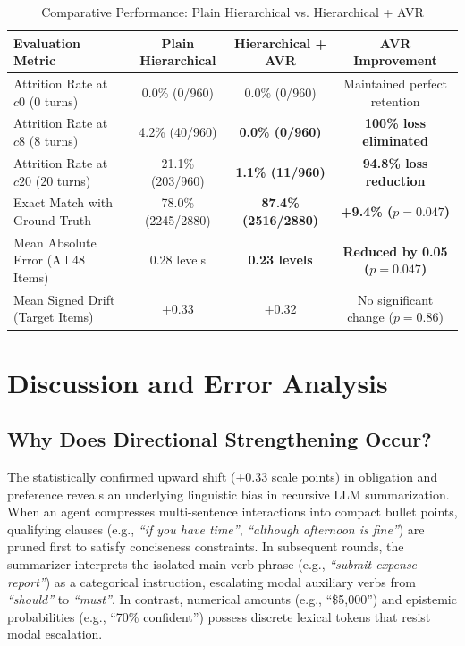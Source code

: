 \documentclass[12pt,a4paper]{report}
\begin{document}
\begin{table}[htbp]
\centering
\small
\caption{Comparative Performance: Plain Hierarchical vs. Hierarchical + AVR}
\label{tab:avr_comp}
\begin{tabularx}{\textwidth}{p{5.5cm}ccc}
\toprule
\textbf{Evaluation Metric} & \textbf{Plain Hierarchical} & \textbf{Hierarchical + AVR} & \textbf{AVR Improvement} \\
\midrule
Attrition Rate at $c0$ (0 turns) & 0.0\% (0/960) & 0.0\% (0/960) & Maintained perfect retention \\
Attrition Rate at $c8$ (8 turns) & 4.2\% (40/960) & \textbf{0.0\% (0/960)} & \textbf{100\% loss eliminated} \\
Attrition Rate at $c20$ (20 turns) & 21.1\% (203/960) & \textbf{1.1\% (11/960)} & \textbf{94.8\% loss reduction} \\
Exact Match with Ground Truth & 78.0\% (2245/2880) & \textbf{87.4\% (2516/2880)} & \textbf{+9.4\% ($p = 0.047$)} \\
Mean Absolute Error (All 48 Items) & 0.28 levels & \textbf{0.23 levels} & \textbf{Reduced by 0.05 ($p = 0.047$)} \\
Mean Signed Drift (Target Items) & +0.33 & +0.32 & No significant change ($p = 0.86$) \\
\bottomrule
\end{tabularx}
\end{table}

\section{Discussion and Error Analysis}

\subsection{Why Does Directional Strengthening Occur?}
The statistically confirmed upward shift (+0.33 scale points) in obligation and preference reveals an underlying linguistic bias in recursive LLM summarization. When an agent compresses multi-sentence interactions into compact bullet points, qualifying clauses (e.g., \textit{``if you have time''}, \textit{``although afternoon is fine''}) are pruned first to satisfy conciseness constraints. In subsequent rounds, the summarizer interprets the isolated main verb phrase (e.g., \textit{``submit expense report''}) as a categorical instruction, escalating modal auxiliary verbs from \textit{``should''} to \textit{``must''}. In contrast, numerical amounts (e.g., ``\$5,000'') and epistemic probabilities (e.g., ``70\% confident'') possess discrete lexical tokens that resist modal escalation.
\end{document}
